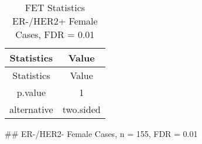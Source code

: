 \documentclass[]{article}
\begin{document}
\begin{longtable}[]{@{}cc@{}}
\caption{FET Statistics ER-/HER2+ Female Cases, FDR =
0.01}\tabularnewline
\toprule
\begin{minipage}[b]{0.18\columnwidth}\centering\strut
Statistics\strut
\end{minipage} & \begin{minipage}[b]{0.14\columnwidth}\centering\strut
Value\strut
\end{minipage}\tabularnewline
\midrule
\endfirsthead
\toprule
\begin{minipage}[b]{0.18\columnwidth}\centering\strut
Statistics\strut
\end{minipage} & \begin{minipage}[b]{0.14\columnwidth}\centering\strut
Value\strut
\end{minipage}\tabularnewline
\midrule
\endhead
\begin{minipage}[t]{0.18\columnwidth}\centering\strut
p.value\strut
\end{minipage} & \begin{minipage}[t]{0.14\columnwidth}\centering\strut
1\strut
\end{minipage}\tabularnewline
\begin{minipage}[t]{0.18\columnwidth}\centering\strut
alternative\strut
\end{minipage} & \begin{minipage}[t]{0.14\columnwidth}\centering\strut
two.sided\strut
\end{minipage}\tabularnewline
\bottomrule
\end{longtable}

\pagebreak
\#\# ER-/HER2- Female Cases, n = 155, FDR = 0.01
\end{document}
